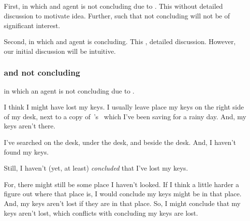 \subsection{}
\label{sec:illu3}

\begin{note}
  First,  in which \requ{} and agent is not concluding due to \requ{}.
  This  without detailed discussion to motivate idea.
  Further,  such that not concluding will not be of significant interest.

  Second,  in which \requ{} and agent is concluding.
  This , detailed discussion.
  However, our initial discussion will be intuitive.
\end{note}

\subsubsection{ and not concluding}

\begin{note}
   in which an agent is not concluding due to \requ{}.
\end{note}

\begin{note}
  \begin{illustration}
    \label{illu:lost-key}
    I think I might have lost my keys.
    I usually leave place my keys on the right side of my desk, next to a copy of~\citeauthor{Vickers:1989tr}'s~ which I've been saving for a rainy day.
    And, my keys aren't there.

    I've searched on the desk, under the desk, and beside the desk.
    And, I haven't found my keys.

    Still, I haven't (yet, at least) \emph{concluded} that I've lost my keys.

    For, there might still be some place I haven't looked.
    If I think a little harder a figure out where that place is, I would conclude my keys might be in that place.
    And, my keys aren't lost if they are in that place.
    So, I might conclude that my keys aren't lost, which conflicts with concluding my keys are lost.
  \end{illustration}
\end{note}

